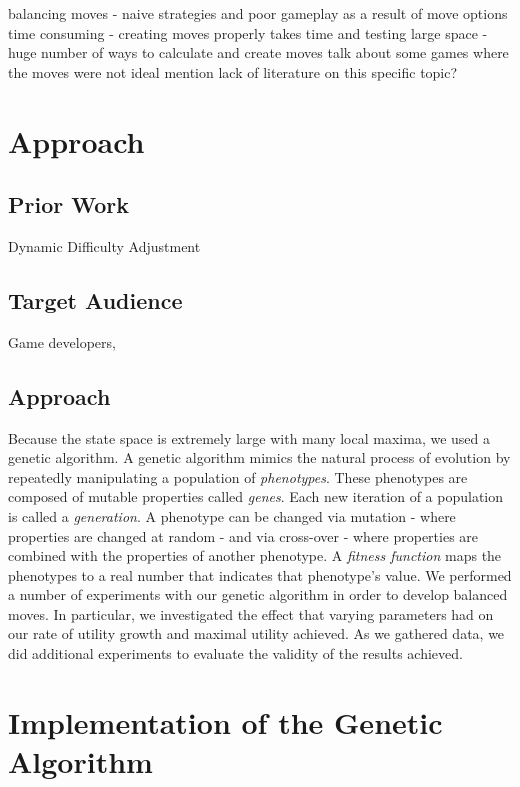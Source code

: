 \documentclass{acm_proc_article-sp}
\begin{document}
balancing moves - naive strategies and poor gameplay as a result of move options
time consuming - creating moves properly takes time and testing
large space - huge number of ways to calculate and create moves
talk about some games where the moves were not ideal
mention lack of literature on this specific topic?

\section{Approach}

\subsection{Prior Work}

Dynamic Difficulty Adjustment

\subsection{Target Audience}

Game developers, 

\subsection{Approach}

Because the state space is extremely large with many local maxima, we used a genetic algorithm. A genetic algorithm mimics the natural process of evolution by repeatedly manipulating a population of \textit{phenotypes}. These phenotypes are composed of mutable properties called \textit{genes}. Each new iteration of a population is called a \textit{generation}. A phenotype can be changed via mutation - where properties are changed at random - and via cross-over - where properties are combined with the properties of another phenotype. A \textit{fitness function} maps the phenotypes to a real number that indicates that phenotype’s value. 
We performed a number of experiments with our genetic algorithm in order to develop balanced moves. In particular, we investigated the effect that varying parameters had on our rate of utility growth and maximal utility achieved. As we gathered data, we did additional experiments to evaluate the validity of the results achieved.

\section{Implementation of the Genetic Algorithm}
\end{document}
